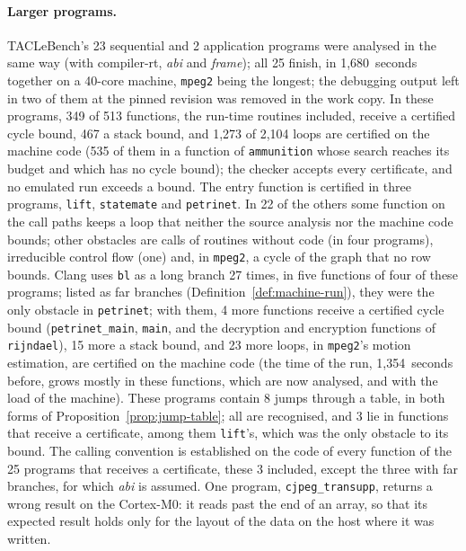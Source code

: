 \documentclass[oneside,english]{amsart}
\numberwithin{equation}{section}
\theoremstyle{plain}
\theoremstyle{definition}
\theoremstyle{plain}
\theoremstyle{plain}
\theoremstyle{remark}
\begin{document}
\paragraph{Larger programs.} TACLeBench's 23 sequential and 2 application programs were analysed in the same way (with compiler-rt, \emph{abi} and \emph{frame}); all 25 finish, in 1{,}680~seconds together on a 40-core machine, \texttt{mpeg2} being the longest; the debugging output left in two of them at the pinned revision was removed in the work copy. In these programs, 349 of 513 functions, the run-time routines included, receive a certified cycle bound, 467 a stack bound, and 1{,}273 of 2{,}104 loops are certified on the machine code (535 of them in a function of \texttt{ammunition} whose search reaches its budget and which has no cycle bound); the checker accepts every certificate, and no emulated run exceeds a bound. The entry function is certified in three programs, \texttt{lift}, \texttt{statemate} and \texttt{petrinet}. In 22 of the others some function on the call paths keeps a loop that neither the source analysis nor the machine code bounds; other obstacles are calls of routines without code (in four programs), irreducible control flow (one) and, in \texttt{mpeg2}, a cycle of the graph that no row bounds. Clang uses \texttt{bl} as a long branch 27 times, in five functions of four of these programs; listed as far branches (Definition~\ref{def:machine-run}), they were the only obstacle in \texttt{petrinet}; with them, 4 more functions receive a certified cycle bound (\texttt{petrinet\_main}, \texttt{main}, and the decryption and encryption functions of \texttt{rijndael}), 15 more a stack bound, and 23 more loops, in \texttt{mpeg2}'s motion estimation, are certified on the machine code (the time of the run, 1{,}354~seconds before, grows mostly in these functions, which are now analysed, and with the load of the machine). These programs contain 8 jumps through a table, in both forms of Proposition~\ref{prop:jump-table}; all are recognised, and 3 lie in functions that receive a certificate, among them \texttt{lift}'s, which was the only obstacle to its bound. The calling convention is established on the code of every function of the 25 programs that receives a certificate, these 3 included, except the three with far branches, for which \emph{abi} is assumed. One program, \texttt{cjpeg\_transupp}, returns a wrong result on the Cortex-M0: it reads past the end of an array, so that its expected result holds only for the layout of the data on the host where it was written.
\end{document}
